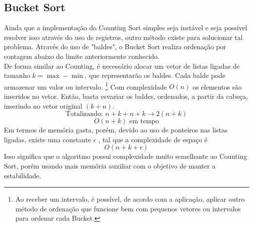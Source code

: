 \documentclass[fontsize=11pt]{article}
\begin{document}
        \subsection{Bucket Sort}
        Ainda que a implementação do Counting Sort simples seja instável e seja 
        possível resolver isso através do uso de registros, outro método existe para
        solucionar tal problema. Através do uso de "baldes", o Bucket Sort realiza
        ordenação por contagem abaixo do limite anteriormente conhecido.
        \\De forma similar ao Counting, é necessário alocar um vetor de listas 
        ligadas de tamanho $k= \max - \min$, que representarão os baldes. 
        Cada balde pode armazenar um valor ou intervalo.
        \footnote[1]{Ao receber um intervalo, é possível, de acordo com a aplicação, 
        aplicar outro método de ordenação que funcione bem com pequenos vetores ou 
        intervalos para ordenar cada Bucket.}
        Com complexidade $O(n)$ os elementos são inseridos no vetor. Então, basta 
        esvaziar os baldes, ordenados, a partir da cabeça, inserindo no vetor 
        original $(k+n)$. 
        $$\text{Totalizando: } n+k+n+k \rightarrow 2(n+k)$$
        $$O(n+k) \text{ em tempo}$$
        Em termos de memória gasta, porém, devido ao uso de ponteiros nas listas ligadas, 
        existe uma constante $\epsilon$ \Cite{moacir}, tal que a complexidade de espaço é 
        $$O(n+k+\epsilon)$$ 
        Isso significa que o algoritmo possui complexidade muito semelhante 
        ao Counting Sort, porém usando mais memória auxiliar com o objetivo de 
        manter a estabilidade.
        
\end{document}
